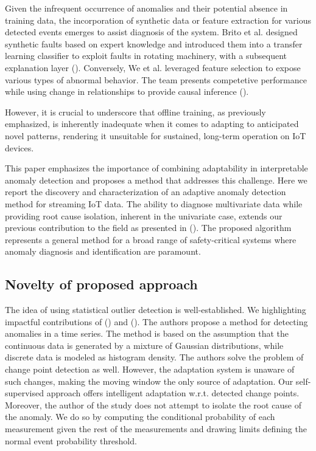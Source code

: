 Given the infrequent occurrence of anomalies and their potential absence in training data, the incorporation of synthetic data or feature extraction for various detected events emerges to assist diagnosis of the system. Brito et al. designed synthetic faults based on expert knowledge and introduced them into a transfer learning classifier to exploit faults in rotating machinery, with a subsequent explanation layer (\cite{BRITO2023120860}). Conversely, We et al. leveraged feature selection to expose various types of abnormal behavior. The team presents competetive performance while using change in relationships to provide causal inference (\cite{WU2024121539}).

However, it is crucial to underscore that offline training, as previously emphasized, is inherently inadequate when it comes to adapting to anticipated novel patterns, rendering it unsuitable for sustained, long-term operation on  IoT devices.

This paper emphasizes the importance of combining adaptability in interpretable anomaly detection and proposes a method that addresses this challenge. Here we report the discovery and characterization of an adaptive anomaly detection method for streaming IoT data. The ability to diagnose multivariate data while providing root cause isolation, inherent in the univariate case, extends our previous contribution to the field as presented in (\cite{Wadinger2023}). The proposed algorithm represents a general method for a broad range of safety-critical systems where anomaly diagnosis and identification are paramount.

\subsection{Novelty of proposed approach}
The idea of using statistical outlier detection is well-established. We highlighting impactful contributions of (\cite{Yamanishi2002}) and (\cite{Yamanishi2004}). The authors propose a method for detecting anomalies in a time series. The method is based on the assumption that the continuous data is generated by a mixture of Gaussian distributions, while discrete data is modeled as histogram density. The authors solve the problem of change point detection as well. However, the adaptation system is unaware of such changes, making the moving window the only source of adaptation. Our self-supervised approach offers intelligent adaptation w.r.t. detected change points. Moreover, the author of the study does not attempt to isolate the root cause of the anomaly. We do so by computing the conditional probability of each measurement given the rest of the measurements and drawing limits defining the normal event probability threshold.

